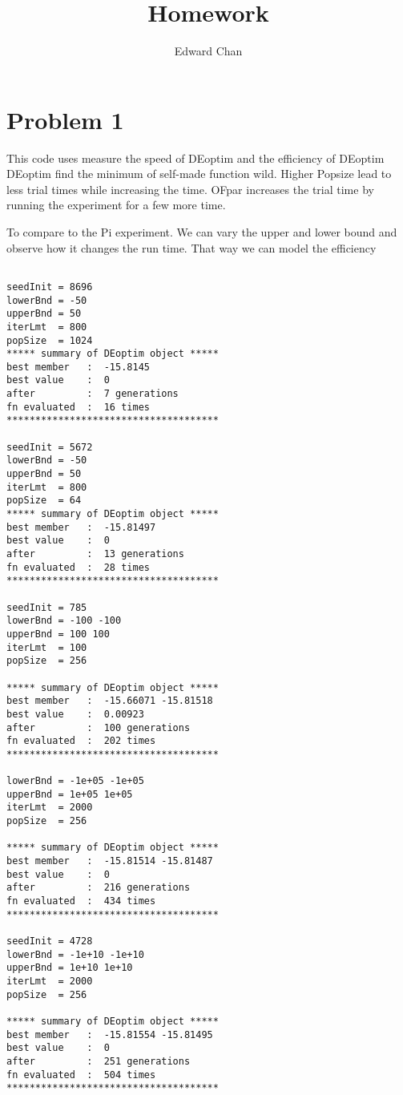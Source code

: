 \documentclass[a4paper]{article}
\title{Homework}
\author{Edward Chan}
\begin{document}
    
    \maketitle
    \section{Problem 1}
        This code uses measure the speed of DEoptim and the efficiency of DEoptim
        DEoptim find the minimum of self-made function wild.
        Higher Popsize lead to less trial times while increasing the time. OFpar 
        increases the trial time by running the experiment for a few more time.

        To compare to the Pi experiment. We can vary the upper and lower bound and
        observe how it changes the run time. That way we can model the efficiency
    \begin{verbatim}

seedInit = 8696 
lowerBnd = -50 
upperBnd = 50 
iterLmt  = 800 
popSize  = 1024 
***** summary of DEoptim object ***** 
best member   :  -15.8145 
best value    :  0 
after         :  7 generations 
fn evaluated  :  16 times 
*************************************

seedInit = 5672 
lowerBnd = -50 
upperBnd = 50 
iterLmt  = 800 
popSize  = 64 
***** summary of DEoptim object ***** 
best member   :  -15.81497 
best value    :  0 
after         :  13 generations 
fn evaluated  :  28 times 
*************************************

seedInit = 785 
lowerBnd = -100 -100 
upperBnd = 100 100 
iterLmt  = 100 
popSize  = 256 

***** summary of DEoptim object ***** 
best member   :  -15.66071 -15.81518 
best value    :  0.00923 
after         :  100 generations 
fn evaluated  :  202 times 
*************************************

lowerBnd = -1e+05 -1e+05 
upperBnd = 1e+05 1e+05 
iterLmt  = 2000 
popSize  = 256 

***** summary of DEoptim object ***** 
best member   :  -15.81514 -15.81487 
best value    :  0 
after         :  216 generations 
fn evaluated  :  434 times 
*************************************

seedInit = 4728 
lowerBnd = -1e+10 -1e+10 
upperBnd = 1e+10 1e+10 
iterLmt  = 2000 
popSize  = 256 

***** summary of DEoptim object ***** 
best member   :  -15.81554 -15.81495 
best value    :  0 
after         :  251 generations 
fn evaluated  :  504 times 
*************************************

    \end{verbatim}
\end{document}
